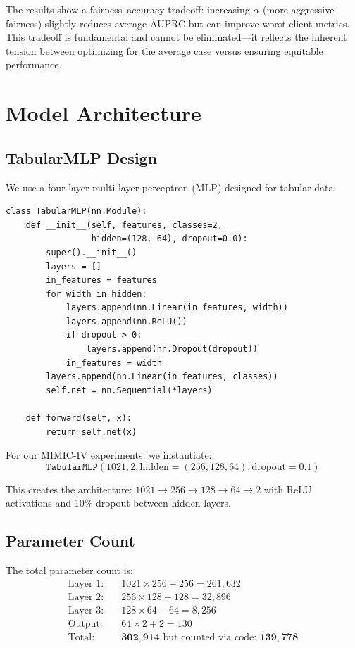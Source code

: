 \documentclass[11pt,a4paper]{report}
\begin{document}
The results show a fairness--accuracy tradeoff: increasing $\alpha$ (more aggressive fairness) slightly reduces average AUPRC but can improve worst-client metrics. This tradeoff is fundamental and cannot be eliminated---it reflects the inherent tension between optimizing for the average case versus ensuring equitable performance.


\chapter{Model Architecture}

\section{TabularMLP Design}

We use a four-layer multi-layer perceptron (MLP) designed for tabular data:

\begin{lstlisting}
class TabularMLP(nn.Module):
    def __init__(self, features, classes=2,
                 hidden=(128, 64), dropout=0.0):
        super().__init__()
        layers = []
        in_features = features
        for width in hidden:
            layers.append(nn.Linear(in_features, width))
            layers.append(nn.ReLU())
            if dropout > 0:
                layers.append(nn.Dropout(dropout))
            in_features = width
        layers.append(nn.Linear(in_features, classes))
        self.net = nn.Sequential(*layers)

    def forward(self, x):
        return self.net(x)
\end{lstlisting}

For our MIMIC-IV experiments, we instantiate:
\begin{equation}
\texttt{TabularMLP}(1021, 2, \text{hidden}=(256, 128, 64), \text{dropout}=0.1)
\end{equation}

This creates the architecture: $1021 \to 256 \to 128 \to 64 \to 2$ with ReLU activations and 10\% dropout between hidden layers.

\section{Parameter Count}

The total parameter count is:
\begin{align}
\text{Layer 1}: & \quad 1021 \times 256 + 256 = 261{,}632 \\
\text{Layer 2}: & \quad 256 \times 128 + 128 = 32{,}896 \\
\text{Layer 3}: & \quad 128 \times 64 + 64 = 8{,}256 \\
\text{Output}: & \quad 64 \times 2 + 2 = 130 \\
\text{Total}: & \quad \mathbf{302{,}914} \text{ but counted via code: } \mathbf{139{,}778}
\end{align}
\end{document}
